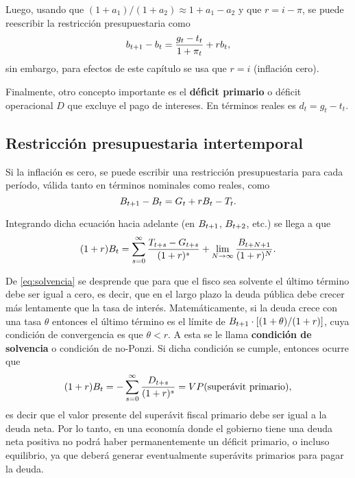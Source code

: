 \documentclass[DeGregorioResumen]{subfiles}
\begin{document}
Luego, usando que $(1+a_1)/(1+a_2) \approx 1+a_1-a_2 $ y que $r=i-\pi $, se puede reescribir la restricción presupuestaria como
\begin{equation}
{b}_{t+1}-b_t = \frac{g_t-t_t}{1+\pi_t}+rb_t,
\end{equation}
sin embargo, para efectos de este capítulo se usa que $r=i$ (inflación cero).

Finalmente, otro concepto importante es el \textbf{déficit primario} o déficit operacional $D$ que excluye el pago de intereses. En términos reales es $d_t = g_t-t_t$.

\subsection{Restricción presupuestaria intertemporal}

Si la inflación es cero, se puede escribir una restricción presupuestaria para cada período, válida tanto en términos nominales como reales, como
\begin{equation}
{B}_{t+1}-B_t = G_t + rB_t - T_t.
\end{equation}

Integrando dicha ecuación hacia adelante (en ${B}_{t+1}$, ${B}_{t+2}$, etc.) se llega a que
\begin{equation}
(1+r)B_t = \sum_{s=0}^{\infty}{\frac{{T}_{t+s}-{G}_{t+s}}{(1+r)^s}+\lim_{N\rightarrow\infty}{\frac{{B}_{t+N+1}}{(1+r)^N}}}.
\label{eq:solvencia}
\end{equation}

De \eqref{eq:solvencia} se desprende que para que el fisco sea solvente el último término debe ser igual a cero, es decir, que en el largo plazo la deuda pública debe crecer más lentamente que la tasa de interés. Matemáticamente, si la deuda crece con una tasa $\theta $ entonces el último término es el límite de ${B}_{t+1}\cdot[(1+\theta)/(1+r)]$, cuya condición de convergencia es que $\theta < r$. A esta se le llama \textbf{condición de solvencia} o condición de no-Ponzi. Si dicha condición se cumple, entonces ocurre que
\begin{equation}
(1+r)B_t = -\sum_{s=0}^{\infty}{\frac{{D}_{t+s}}{(1+r)^s}} = VP(\text{superávit primario}),
\label{eq:restriccion_superavit_primario}
\end{equation}
es decir que el valor presente del superávit fiscal primario debe ser igual a la deuda neta. Por lo tanto, en una economía donde el gobierno tiene una deuda neta positiva no podrá haber permanentemente un déficit primario, o incluso equilibrio, ya que deberá generar eventualmente superávits primarios para pagar la deuda.
\end{document}
